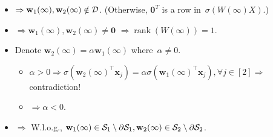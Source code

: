 \documentclass[handout,usenames,dvipsnames]{beamer} %
\DeclareMathOperator{\rank}{rank}
\newcommand{\bx}{\mathbf{x}}
\newcommand{\bw}{\mathbf{w}}
\newcommand{\cd}{{\cal D}}
\newcommand{\cs}{{\cal S}}
\newcommand{\zero}{{\mathbf{0}}}
\begin{document}
\begin{frame}
    \begin{itemize}
        \pause
        \item $\Rightarrow \bw_1(\infty), \bw_2(\infty) \notin \cd$. (Otherwise, $\zero^T$ is a row in~$\sigma(W(\infty) X)$.)
        \pause
        \item $\Rightarrow \bw_1(\infty), \bw_2(\infty) \ne \zero$ $\Rightarrow \rank(W(\infty))=1$. 
        \pause
        \item Denote $\bw_2(\infty) = \alpha \bw_1(\infty)$ where~$\alpha \neq 0$.
        \pause
        \begin{itemize}
            \item $\alpha > 0 \Rightarrow \sigma(\bw_2(\infty)^\top \bx_j) = \alpha \sigma(\bw_1(\infty)^\top \bx_j), \forall j \in [2] \Rightarrow$ contradiction!
            \item $\Rightarrow \alpha < 0$.
        \end{itemize}
        \pause
        \item $\Rightarrow$ W.l.o.g., $\bw_1(\infty) \in \cs_1 \setminus \partial \cs_1, \bw_2(\infty) \in \cs_2 \setminus \partial \cs_2$.
    \end{itemize}
    

\end{frame}
\end{document}
